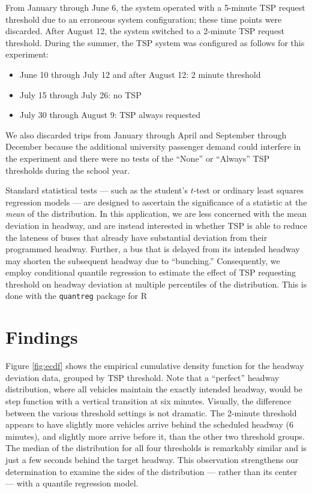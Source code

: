 \documentclass[3p, authoryear, review]{elsarticle} %
\providecommand{\tightlist}{%
  \setlength{\itemsep}{0pt}\setlength{\parskip}{0pt}}
\begin{document}
From January through June 6, the system operated with a 5-minute TSP request
threshold due to an erroneous system configuration; these time points were
discarded. After August 12, the system switched to a 2-minute TSP request
threshold. During the summer, the TSP system was configured as follows for this
experiment:

\begin{itemize}
\tightlist
\item
  June 10 through July 12 and after August 12: 2 minute threshold
\item
  July 15 through July 26: no TSP
\item
  July 30 through August 9: TSP always requested
\end{itemize}

We also discarded trips from January through April and September through
December because the additional university passenger demand could interfere in
the experiment and there were no tests of the ``None'' or ``Always'' TSP thresholds
during the school year.

Standard statistical tests --- such as the student's \(t\)-test or
ordinary least squares regression models --- are designed to ascertain the
significance of a statistic at the \emph{mean} of the distribution. In this
application, we are less concerned with the mean deviation in headway, and are
instead interested in whether TSP is able to reduce the lateness of buses that
already have substantial deviation from their programmed headway. Further, a bus
that is delayed from its intended headway may shorten the subsequent headway due
to ``bunching.'' Consequently, we employ conditional quantile regression
\citep{koenker2001quantile} to estimate the effect of TSP requesting threshold on
headway deviation at multiple percentiles of the distribution. This is
done with the \texttt{quantreg} package for R \citep{quantreg, R}

\hypertarget{findings}{%
\section{Findings}\label{findings}}

Figure \ref{fig:ecdf} shows the empirical cumulative density function for the
headway deviation data, grouped by TSP threshold. Note that a ``perfect''
headway distribution, where all vehicles maintain the exactly intended headway,
would be step function with a vertical transition at six minutes.
Visually, the difference between the various threshold settings is not dramatic.
The 2-minute threshold appears to have slightly more vehicles arrive behind the
scheduled headway (6 minutes), and slightly more arrive before it, than the
other two threshold groups. The median of the distribution for all
four thresholds is remarkably similar and is just a few seconds behind the target
headway. This observation strengthens our determination to examine the sides of
the distribution --- rather than its center --- with a quantile regression model.
\end{document}
